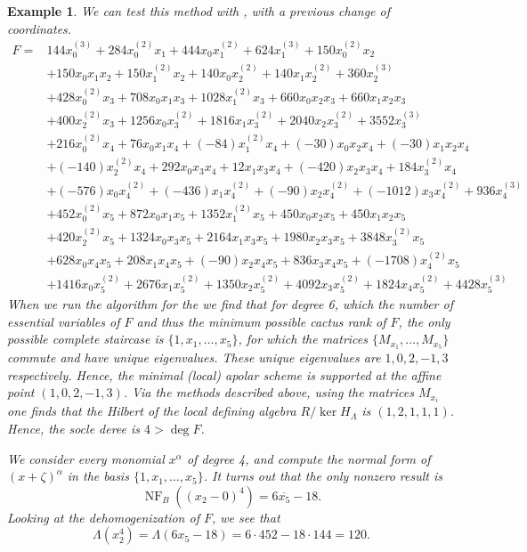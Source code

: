 \documentclass[a4paper,11p]{amsart}
\newtheorem{example0}[defn0]{Example}
\newenvironment{example}{ \begin{example0}\rm}{\end{example0}}
\begin{document}
\begin{example}
    We can test this method with \cite[Example 4.6]{GAD}, with a previous change of coordinates.
{\small{
\[
\begin{aligned}
F= &144x_0^{(3)} + 284x_0^{(2)}x_1 + 444x_0x_1^{(2)} + 624x_1^{(3)} + 150x_0^{(2)}x_2 \\
&+ 150x_0x_1x_2 + 150x_1^{(2)}x_2 + 140x_0x_2^{(2)} + 140x_1x_2^{(2)} + 360x_2^{(3)} \\
&+ 428x_0^{(2)}x_3 + 708x_0x_1x_3 + 1028x_1^{(2)}x_3 + 660x_0x_2x_3 + 660x_1x_2x_3 \\
&+ 400x_2^{(2)}x_3 + 1256x_0x_3^{(2)} + 1816x_1x_3^{(2)} + 2040x_2x_3^{(2)} + 3552x_3^{(3)} \\
&+ 216x_0^{(2)}x_4 + 76x_0x_1x_4 + (-84)x_1^{(2)}x_4 + (-30)x_0x_2x_4 + (-30)x_1x_2x_4 \\
&+ (-140)x_2^{(2)}x_4 + 292x_0x_3x_4 + 12x_1x_3x_4 + (-420)x_2x_3x_4 + 184x_3^{(2)}x_4 \\
&+ (-576)x_0x_4^{(2)} + (-436)x_1x_4^{(2)} + (-90)x_2x_4^{(2)} + (-1012)x_3x_4^{(2)} + 936x_4^{(3)} \\
&+ 452x_0^{(2)}x_5 + 872x_0x_1x_5 + 1352x_1^{(2)}x_5 + 450x_0x_2x_5 + 450x_1x_2x_5 \\
&+ 420x_2^{(2)}x_5 + 1324x_0x_3x_5 + 2164x_1x_3x_5 + 1980x_2x_3x_5 + 3848x_3^{(2)}x_5 \\
&+ 628x_0x_4x_5 + 208x_1x_4x_5 + (-90)x_2x_4x_5 + 836x_3x_4x_5 + (-1708)x_4^{(2)}x_5 \\
&+ 1416x_0x_5^{(2)} + 2676x_1x_5^{(2)} + 1350x_2x_5^{(2)} + 4092x_3x_5^{(2)} + 1824x_4x_5^{(2)} + 4428x_5^{(3)}
\end{aligned}
\]
}}
    When we run the algorithm for the we find that for degree 6, which the number of essential variables of $F$ and thus the minimum possible cactus rank of $F$, the only possible complete staircase is $\{1,x_1,\ldots, x_5\}$, for which the matrices $\{M_{x_1}, \ldots , M_{x_5}\}$ commute and have unique eigenvalues. These unique eigenvalues are $1,0,2,-1,3$ respectively.  Hence, the minimal (local) apolar scheme is supported at the affine point $(1,0,2,-1,3)$. Via the methods described above, using the matrices $M_{x_i}$ one finds that the Hilbert of the local defining algebra $R/\ker H_\Lambda$ is $(1,2,1,1,1)$. Hence, the socle deree is $4>\deg F$. 

    \bigskip
    
    We consider every monomial $x^\alpha$ of degree 4, and compute the normal form of $(x+\zeta)^\alpha$ in the basis $\{1,x_1,\ldots,x_5\}$. It turns out that the only nonzero result is 
\[\operatorname{NF}_B((x_2-0)^4)=6\overline{x_5}-18.\]
    Looking at the dehomogenization of $F$, we see that $$\Lambda(x_2^4)=\Lambda(6x_5-18)=6\cdot 452-18\cdot 144=120.$$
    

\end{example}
\end{document}
